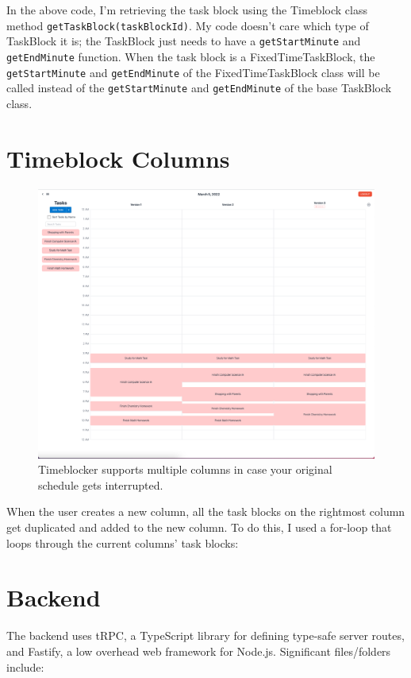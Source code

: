 \documentclass[notitlepage, 12pt]{report}
\newcommand{\code}[1]{\texttt{#1}}
\begin{document}
\begin{sloppypar}
	In the above code, I'm retrieving the task block using the Timeblock class method \code{getTaskBlock(taskBlockId)}. My code doesn't care which type of TaskBlock it is; the TaskBlock just needs to have a \code{getStartMinute} and \code{getEndMinute} function. When the task block is a FixedTimeTaskBlock, the \code{getStartMinute} and \code{getEndMinute} of the FixedTimeTaskBlock class will be called instead of the \code{getStartMinute} and \code{getEndMinute} of the base TaskBlock class.
\end{sloppypar}

\newpage

\section*{Timeblock Columns}

\begin{figure}[H]
	\caption{Timeblocker supports multiple columns in case your original schedule gets interrupted.}
	\includegraphics[width=\textwidth]{columns.png}
\end{figure}

When the user creates a new column, all the task blocks on the rightmost column get duplicated and added to the new column. To do this, I used a for-loop that loops through the current columns' task blocks:

\newpage

\section*{Backend}
The backend uses tRPC, a TypeScript library for defining type-safe server routes, and Fastify, a low overhead web framework for Node.js. Significant files/folders include:
\end{document}
